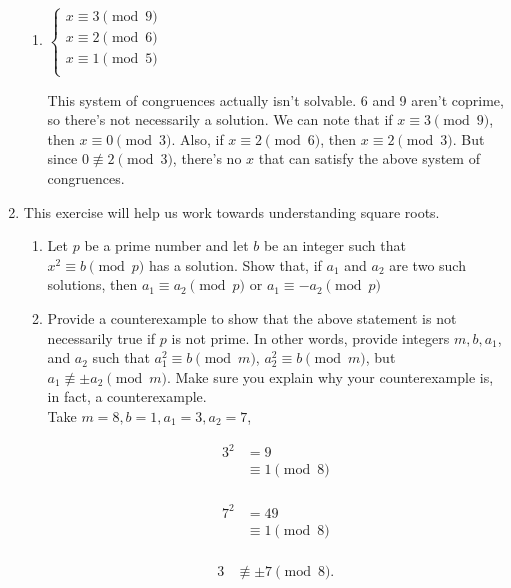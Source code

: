 \documentclass[11pt]{article}
\newcommand{\n}{\vspace{0.5cm}}
\begin{document}
\begin{enumerate}
\begin{enumerate}
        \item \(\begin{cases}
            x \equiv 3 \pmod{9} \\
            x \equiv 2 \pmod{6} \\
            x \equiv 1 \pmod{5} \\
          \end{cases}\) \n

          This system of congruences actually isn't solvable.  6 and 9 aren't coprime, so there's not necessarily a solution.  We can note that if \(x \equiv 3 \pmod 9\), then \(x \equiv 0 \pmod 3\).  Also, if \(x \equiv 2 \pmod 6\), then \(x \equiv 2 \pmod 3\).  But since \(0 \not\equiv 2 \pmod 3\), there's no \(x\) that can satisfy the above system of congruences.
      \end{enumerate}

    \item This exercise will help us work towards understanding square roots.
      \begin{enumerate}
        \item Let \(p\) be a prime number and let \(b\) be an integer such that \(x^2 \equiv b \pmod p\) has a solution.  Show that, if \(a_1\) and \(a_2\) are two such solutions, then \(a_1 \equiv a_2 \pmod p\) or \(a_1 \equiv -a_2 \pmod p\)
        \item Provide a counterexample to show that the above statement is not necessarily true if \(p\) is not prime.  In other words, provide integers \(m, b, a_1\), and \(a_2\) such that \(a_1^2 \equiv b \pmod m\), \(a_2^2 \equiv b \pmod m\), but \(a_1 \not\equiv \pm a_2 \pmod m\). Make sure you explain why your counterexample is, in fact, a counterexample. \n\\
          Take \(m=8, b=1, a_1=3, a_2=7\),

          \begin{minipage}{0.28\textwidth}
            \begin{align*}
              3^2 &= 9 \\
                  &\equiv 1 \pmod8 \\
            \end{align*}
          \end{minipage}
          \begin{minipage}{0.28\textwidth}
            \begin{align*}
              7^2 &= 49 \\
                  &\equiv 1 \pmod8 \\
            \end{align*}
          \end{minipage}
          \begin{minipage}{0.28\textwidth}
            \begin{align*}
              3 &\not\equiv \pm 7 \pmod8. \\
            \end{align*}
          \end{minipage}
      \end{enumerate}


\end{enumerate}
\end{document}
